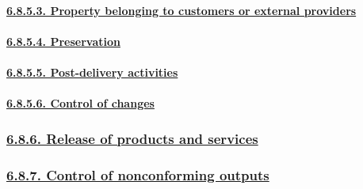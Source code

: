 \documentclass[
]{article}
\begin{document}
\hypertarget{property-belonging-to-customers-or-external-providers}{%
\paragraph{\texorpdfstring{\protect\hyperlink{property-belonging-to-customers-or-external-providers-1}{6.8.5.3.
Property belonging to customers or external
providers}}{6.8.5.3. Property belonging to customers or external providers}}\label{property-belonging-to-customers-or-external-providers}}

\hypertarget{preservation}{%
\paragraph{\texorpdfstring{\protect\hyperlink{preservation-1}{6.8.5.4.
Preservation}}{6.8.5.4. Preservation}}\label{preservation}}

\hypertarget{post-delivery-activities}{%
\paragraph{\texorpdfstring{\protect\hyperlink{post-delivery-activities-1}{6.8.5.5.
Post-delivery
activities}}{6.8.5.5. Post-delivery activities}}\label{post-delivery-activities}}

\hypertarget{control-of-changes}{%
\paragraph{\texorpdfstring{\protect\hyperlink{control-of-changes-1}{6.8.5.6.
Control of
changes}}{6.8.5.6. Control of changes}}\label{control-of-changes}}

\hypertarget{release-of-products-and-services}{%
\subsubsection{\texorpdfstring{\protect\hyperlink{release-of-products-and-services-1}{6.8.6.
Release of products and
services}}{6.8.6. Release of products and services}}\label{release-of-products-and-services}}

\hypertarget{control-of-nonconforming-outputs}{%
\subsubsection{\texorpdfstring{\protect\hyperlink{control-of-nonconforming-outputs-1}{6.8.7.
Control of nonconforming
outputs}}{6.8.7. Control of nonconforming outputs}}\label{control-of-nonconforming-outputs}}
\end{document}
